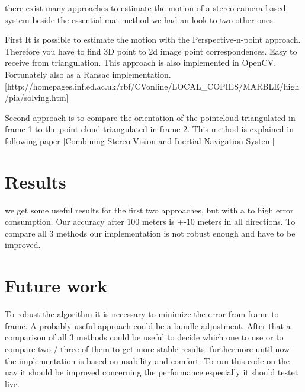 \documentclass[11pt]{article}
\begin{document}
	there exist many approaches to estimate the motion of a stereo camera based system beside the essential mat method we had an look to two other ones.
	
	First It is possible to estimate the motion with the Perspective-n-point approach. Therefore you have to find 3D point to 2d image point correspondences. Easy to receive from triangulation. This approach is also implemented in OpenCV. Fortunately also as a Ransac implementation. [http://homepages.inf.ed.ac.uk/rbf/CVonline/LOCAL\_COPIES/MARBLE/high/pia/solving.htm]
	
	Second approach is to compare the orientation of the pointcloud triangulated in frame 1 to the point cloud triangulated in frame 2. This method is explained in following paper [Combining Stereo Vision and Inertial Navigation System]
	
	\section{Results}
	we get some useful results for the first two approaches, but with a to high error consumption. Our accuracy after 100 meters is +-10 meters in all directions.
	To compare all 3 methods our implementation is not robust enough and have to be improved.
	
	
	\section{Future work}
	To robust the algorithm it is necessary to minimize the error from frame to frame. A probably useful approach could be a bundle adjustment. After that a comparison of all 3 methods could be useful to decide which one to use or to compare two / three of them to get more stable results.
	furthermore until now the implementation is based on usability and comfort. To run this code on the uav it should be improved concerning the performance especially it should testet live.
	
		
	
	
\end{document}
